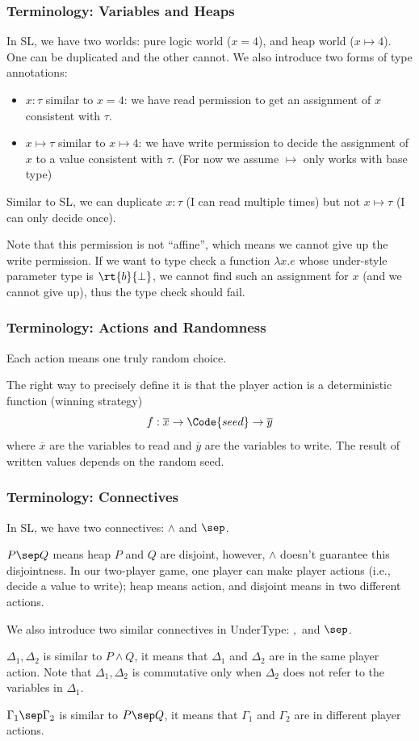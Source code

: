 \begin{frame}
    \frametitle{Terminology: Variables and Heaps}
    
In SL, we have two worlds: pure logic world ($x = 4$), and heap world ($x \mapsto 4$). One can be duplicated and the other cannot. We also introduce two forms of type annotations:
\begin{itemize}
    \item $x : \tau$ similar to $x = 4$: we have read permission to get an assignment of $x$ consistent with $\tau$.
    \item $x \mapsto \tau$ similar to $x \mapsto 4$: we have write permission to decide the assignment of $x$ to a value consistent with $\tau$. (For now we assume $\mapsto$ only works with base type)
\end{itemize}

Similar to SL, we can duplicate $x : \tau$ (I can read multiple times) but not $x \mapsto \tau$ (I can only decide once).

Note that this permission is not ``affine'', which means we cannot give up the write permission. If we want to type check a function $\lambda x.e$ whose under-style parameter type is $\rt{b}{\bot}$, we cannot find such an assignment for $x$ (and we cannot give up), thus the type check should fail.
\end{frame}

\begin{frame}
    \frametitle{Terminology: Actions and Randomness}

Each action means one truly random choice.

The right way to precisely define it is that the player action is a deterministic function (winning strategy) 
\[ f: \overline{x} \to \Code{seed} \to \overline{y} \]
where $\overline{x}$ are the variables to read and $\overline{y}$ are the variables to write. The result of written values depends on the random seed.

\end{frame}

\begin{frame}
    \frametitle{Terminology: Connectives}
    
In SL, we have two connectives: $\land$ and $\sep$. 

$P \sep Q$ means heap $P$ and $Q$ are disjoint, however, $\land$ doesn't guarantee this disjointness. In our two-player game, one player can make player actions (i.e., decide a value to write); heap means action, and disjoint means in two different actions.

We also introduce two similar connectives in UnderType: $,$ and $\sep$.

$\Delta_1, \Delta_2$ is similar to $P \land Q$, it means that $\Delta_1$ and $\Delta_2$ are in the same player action. Note that $\Delta_1, \Delta_2$ is commutative only when $\Delta_2$ does not refer to the variables in $\Delta_1$.

$\Gamma_1 \sep \Gamma_2$ is similar to $P \sep Q$, it means that $\Gamma_1$ and $\Gamma_2$ are in different player actions.
\end{frame}

